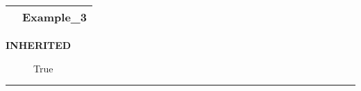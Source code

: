 {\renewcommand{\arraystretch}{1.5}
\begin{tabularx}{\textwidth}{|>{\raggedright\arraybackslash}l|X|}
\hline
\hspace{0pt}\mytexttt{\color{red} } & \textbf{Example\_3} \\
\hline
\end{tabularx}
}

\par

\par
\begin{description}
\item [\colorbox{tagtype}{\color{white} \textbf{\textsf{INHERITED}}}] \textbf{\underline{}} True
\end{description}

\rule{\linewidth}{0.5pt}


